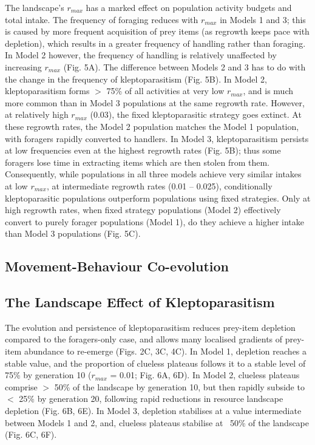 \documentclass[11pt]{article}
\begin{document}
The landscape's $r_{max}$ has a marked effect on population activity budgets and total intake.
The frequency of foraging reduces with $r_{max}$ in Models 1 and 3; this is caused by more frequent acquisition of prey items (as regrowth keeps pace with depletion), which results in a greater frequency of handling rather than foraging.
In Model 2 however, the frequency of handling is relatively unaffected by increasing $r_{max}$ (Fig. 5A).
The difference between Models 2 and 3 has to do with the change in the frequency of kleptoparasitism (Fig. 5B).
In Model 2, kleptoparasitism forms $>$ 75\% of all activities at very low $r_{max}$, and is much more common than in Model 3 populations at the same regrowth rate.
However, at relatively high $r_{max}$ (0.03), the fixed kleptoparasitic strategy goes extinct.
At these regrowth rates, the Model 2 population matches the Model 1 population, with foragers rapidly converted to handlers.
In Model 3, kleptoparasitism persists at low frequencies even at the highest regrowth rates (Fig. 5B); thus some foragers lose time in extracting items which are then stolen from them.
Consequently, while populations in all three models achieve very similar intakes at low $r_{max}$, at intermediate regrowth rates (0.01 -- 0.025), conditionally kleptoparasitic populations outperform populations using fixed strategies.
Only at high regrowth rates, when fixed strategy populations (Model 2) effectively convert to purely forager populations (Model 1), do they achieve a higher intake than Model 3 populations (Fig. 5C).

\subsection{Movement-Behaviour Co-evolution}

\subsection{The Landscape Effect of Kleptoparasitism}

The evolution and persistence of kleptoparasitism reduces prey-item depletion compared to the foragers-only case, and allows many localised gradients of prey-item abundance to re-emerge (Figs. 2C, 3C, 4C).
In Model 1, depletion reaches a stable value, and the proportion of clueless plateaus follows it to a stable level of 75\% by generation 10 ($r_{max}$ = 0.01; Fig. 6A, 6D).
In Model 2, clueless plateaus comprise $>$ 50\% of the landscape by generation 10, but then rapidly subside to $<$ 25\% by generation 20, following rapid reductions in resource landscape depletion (Fig. 6B, 6E).
In Model 3, depletion stabilises at a value intermediate between Models 1 and 2, and, clueless plateaus stabilise at ~50\% of the landscape (Fig. 6C, 6F).
\end{document}
